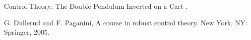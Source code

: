%

%

\begin{flushleft}
\begin{thebibliography}{9}


Control Theory: The Double Pendulum Inverted on a Cart
.


G. Dullerud and F. Paganini, A course in robust control theory. New York, NY: Springer, 2005.
\end{thebibliography}
\end{flushleft}

%
